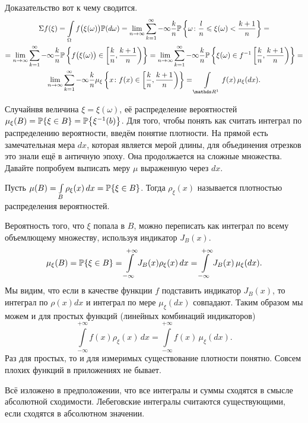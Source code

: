 \begin{Proof}
  Доказательство вот к чему сводится.
\begin{multline*}
  \E f(\xi) = \int\limits_{\Omega} f\big( \xi(\omega)\big) \P(d\omega) = \lim\limits_{n\to\infty} \rY k{-\infty}\frac kn\P\left\{ \omega\colon \frac ln \le \xi(\omega) < \frac{k+1}n \right\} = 
\\= \lim\limits_{n\to\infty} \rY k{-\infty} \frac kn \P\left\{  f\big(\xi(\omega)\big)\in \left[ \frac kn,\frac{k+1}n \right) \right\} = 
    \lim\limits_{n\to\infty} \rY k{-\infty} \frac kn \P\left\{ \xi(\omega)\in f^{-1} \left[ \frac kn,\frac{k+1}n \right) \right\} = \\
   \lim\limits_{n\to\infty} \rY k{-\infty} \frac kn \mu_\xi \left\{ x\colon f(x)\in \left[ \frac kn,\frac{k+1}n \right) \right\} 
  = \int\limits_{\R^1} f(x)\,\mu_\xi(dx).
\end{multline*}
\end{Proof}

Случайнвя величина $\xi = \xi(\omega)$, её распределение вероятностей $\mu_\xi(B) = \P\{\xi \in B\} = \P\big\{\xi^{-1}(b)\big\}$. Для того, чтобы понять как считать интеграл по распределению вероятности, введём понятие плотности. На прямой есть замечательная мера $dx$, которая является мерой длины, для объединения отрезков это знали ещё в античную эпоху. Она продолжается на сложные множества. Давайте попробуем выписать меру $\mu$ выраженную через $dx$.

\begin{Def}
  Пусть $\mu(B) = \int\limits_B \rho_\xi(x)\,dx = \P\{\xi \in B\}$. Тогда $\rho_\xi(x)$ называется плотностью распределения вероятностей.
\end{Def}

Вероятность того, что $\xi$ попала в $B$, можно переписать как интеграл по всему объемлющему множеству, используя индикатор $J_B(x)$.
\[
  \mu_\xi(B) = \P\{\xi \in B\} = \int\limits_{-\infty}^{+\infty} J_B(x) \rho_\xi(x)\,dx = 
  \int\limits_{-\infty}^{+\infty} J_B(x)\,\mu_\xi(dx).
\]
Мы видим, что если в качестве функции $f$ подставить индикатор $J_B(x)$, то интеграл по $\rho(x) dx$ и интеграл по мере $\mu_\xi(dx)$ совпадают. Таким образом мы можем и для простых функций (линейных комбинаций индикаторов)
\[
  \int\limits_{-\infty}^{+\infty} f(x) \rho_\xi(x)\,dx = \int\limits_{-\infty}^{+\infty} f(x)\,\mu_\xi(dx).
\]
Раз для простых, то и для измеримых существование плотности понятно. Совсем плохих функций в приложениях не бывает.

Всё изложено в предположении, что все интегралы и суммы сходятся в смысле абсолютной сходимости. Лебеговские интегралы считаются существующими, если сходятся в абсолютном значении.

